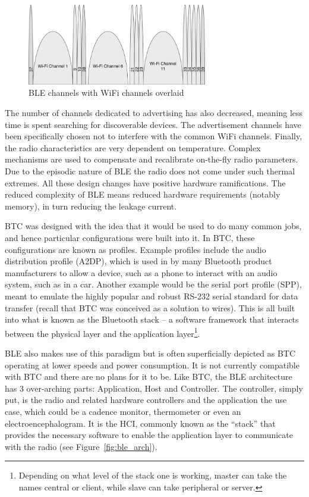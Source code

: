 \documentclass[]{article}
\begin{document}
\begin{figure}[htb]
	\begin{center}
		\includegraphics[width = 0.7\textwidth]{blechannelswifi}
	\end{center}
	\caption{\ac{BLE} channels with WiFi channels overlaid}
	\label{fig:blechannelswifi}
\end{figure}


The number of channels dedicated to advertising has also decreased, meaning less time is spent searching for discoverable devices. The advertisement channels have been specifically chosen not to interfere with the common WiFi channels. Finally, the radio characteristics are very dependent on temperature. Complex mechanisms are used to compensate and recalibrate on-the-fly radio parameters. Due to the episodic nature of \ac{BLE} the radio does not come under such thermal extremes. All these design changes have positive hardware ramifications. The reduced complexity of \ac{BLE} means reduced hardware requirements (notably memory), in turn reducing the leakage current. 

\ac{BTC} was designed with the idea that it would be used to do many common jobs, and hence particular configurations were built into it. In \ac{BTC}, these configurations are known as profiles. Example profiles include the audio distribution profile (A2DP), which is used in by many Bluetooth product manufacturers to allow a device, such as a phone to interact with an audio system, such as in a car. Another example would be the serial port profile (SPP), meant to emulate the highly popular and robust RS-232 serial standard for data transfer (recall that \ac{BTC} was conceived as a solution to wires). This is all built into what is known as the Bluetooth stack – a software framework that interacts between the physical layer and the application layer\footnote{Depending on what level of the stack one is working, master can take the names central or client, while slave can take peripheral or server.}.  

\ac{BLE} also makes use of this paradigm but is often superficially depicted as \ac{BTC} operating at lower speeds and power consumption. It is not currently compatible with \ac{BTC} and there are no plans for it to be. Like \ac{BTC}, the \ac{BLE} architecture has 3 over-arching parts: Application, Host and Controller. The controller, simply put, is the radio and related hardware controllers and the application the use case, which could be a cadence monitor, thermometer or even an electroencephalogram. It is the \ac{HCI}, commonly known as the “stack” that provides the necessary software to enable the application layer to communicate with the radio (see Figure~\ref{fig:ble_arch}).
\end{document}
